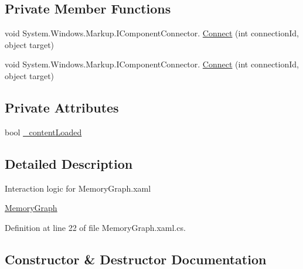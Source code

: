 \subsection*{Private Member Functions}
\begin{DoxyCompactItemize}
\item 
void System.\+Windows.\+Markup.\+I\+Component\+Connector. \hyperlink{class_c_p_u___o_s___simulator_1_1_controls_1_1_graphs_1_1_memory_graph_afbdb45aa126b42b49cdf0c1252a33181}{Connect} (int connection\+Id, object target)
\item 
void System.\+Windows.\+Markup.\+I\+Component\+Connector. \hyperlink{class_c_p_u___o_s___simulator_1_1_controls_1_1_graphs_1_1_memory_graph_afbdb45aa126b42b49cdf0c1252a33181}{Connect} (int connection\+Id, object target)
\end{DoxyCompactItemize}
\subsection*{Private Attributes}
\begin{DoxyCompactItemize}
\item 
bool \hyperlink{class_c_p_u___o_s___simulator_1_1_controls_1_1_graphs_1_1_memory_graph_a1abe1c0b96a7194ab7f367b2635ab562}{\+\_\+content\+Loaded}
\end{DoxyCompactItemize}


\subsection{Detailed Description}
Interaction logic for Memory\+Graph.\+xaml 

\hyperlink{class_c_p_u___o_s___simulator_1_1_controls_1_1_graphs_1_1_memory_graph}{Memory\+Graph} 

Definition at line 22 of file Memory\+Graph.\+xaml.\+cs.



\subsection{Constructor \& Destructor Documentation}
\hypertarget{class_c_p_u___o_s___simulator_1_1_controls_1_1_graphs_1_1_memory_graph_ac5c79c29c215a897c7446df47519d238}{}
